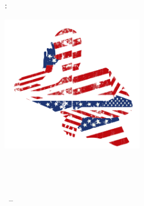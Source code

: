 \begin{titlepage}
	\begin{addmargin}[-1cm]{-3cm}
    \begin{center}
        \large  

        \hfill

        \vfill

        \begingroup
            \color{Maroon}\spacedallcaps{\myTitle}: \\
            \spacedallcaps{\mySubtitle} \bigskip
        \endgroup

        \spacedlowsmallcaps{\myName}

        \vfill

        \includegraphics[width=6cm]{./gfx/listener_logo.pdf} \\ \medskip

        \vfill 
        
	\myFaculty \\
	\myUni \\
	\myLocation \\  

        \myTime\ -- \myVersion

                             

    \end{center}  
  \end{addmargin}       
\end{titlepage}   